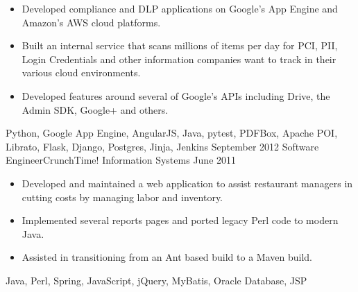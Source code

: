 \begin{experiences}
{                      \begin{itemize}
                        \item Developed compliance and DLP applications on Google's App Engine and Amazon's AWS cloud platforms.
                        \item Built an internal service that scans millions of items per day for PCI, PII, Login Credentials and other information companies want to track in their various cloud environments.
                        \item Developed features around several of Google's APIs including Drive, the Admin SDK, Google+ and others.
                      \end{itemize}
                  }
                  {Python, Google App Engine, AngularJS, Java, pytest, PDFBox, Apache POI, Librato, Flask, Django, Postgres, Jinja, Jenkins}
\emptySeparator
  \experience
  {September 2012}  {Software Engineer}{CrunchTime! Information Systems}
  {June 2011}   {
                      \begin{itemize}
                        \item Developed and maintained a web application to assist restaurant managers in cutting costs by managing labor and inventory.
                        \item Implemented several reports pages and ported legacy Perl code to modern Java.   
                        \item Assisted in transitioning from an Ant based build to a Maven build.
                      \end{itemize}
                  }
                  {Java, Perl, Spring, JavaScript, jQuery, MyBatis, Oracle Database, JSP}
\end{experiences}
